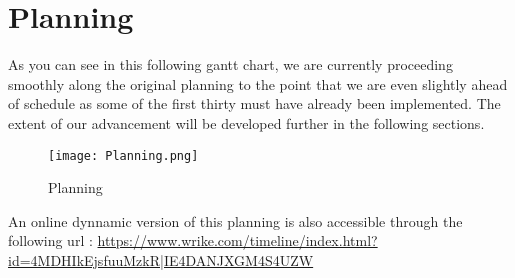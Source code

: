 \section{Planning}

As you can see in this following gantt chart, we are currently proceeding smoothly along the original planning to the point that we are even slightly ahead of schedule as some of the first thirty must have already been implemented. The extent of our advancement will be developed further in the following sections. \newline

\begin{figure}[H]
	\centering
	\texttt{[image: Planning.png]}
	\caption{Planning}
	\label{fig:length_eight_mouse}
\end{figure}

An online dynnamic version of this planning is also accessible through the following url :
\url{https://www.wrike.com/timeline/index.html?id=4MDHIkEjsfuuMzkR|IE4DANJXGM4S4UZW}
